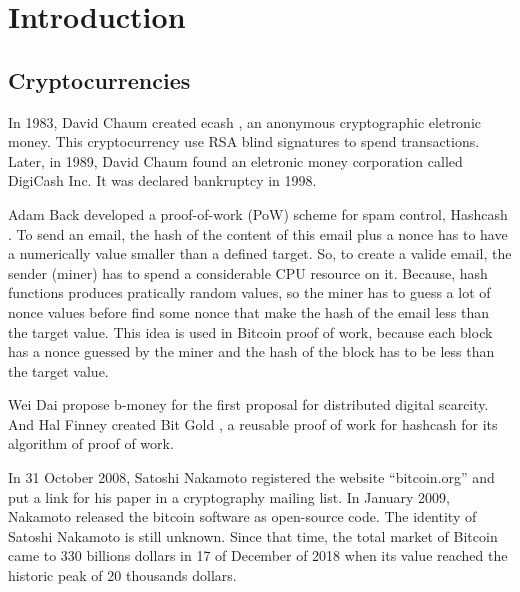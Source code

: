 \documentclass[12pt]{article}
\begin{document}

\tableofcontents
\pagebreak

\renewcommand{\thesection}{\arabic{section}}
\section{Introduction}

\subsection{Cryptocurrencies}

In 1983, David Chaum created ecash \cite{panurach1996money} , an anonymous cryptographic eletronic money.
This cryptocurrency use RSA blind signatures \cite{chaum1983blind} to spend transactions.
Later, in 1989, David Chaum found an eletronic money corporation called DigiCash Inc.
It was declared bankruptcy in 1998.

Adam Back developed a proof-of-work (PoW) scheme for spam control, Hashcash \cite{back2002hashcash}.
To send an email, the hash of the content of this email plus a nonce has to have a numerically value smaller than a defined target.
So, to create a valide email, the sender (miner) has to spend a considerable CPU resource on it.
Because, hash functions produces pratically random values, so the miner has to guess a lot of nonce values before find some nonce that make the hash of the email less than the target value.
This idea is used in Bitcoin proof of work, because each block has a nonce guessed by the miner and the hash of the block has to be less than the target value.

Wei Dai propose b-money \cite{dai1998b} for the first proposal for distributed digital scarcity.
And Hal Finney created Bit Gold \cite{wallace2011rise}, a reusable proof of work for hashcash for its algorithm of proof of work.

In 31 October 2008, Satoshi Nakamoto registered the website ``bitcoin.org'' and put a link for his paper \cite{nakamoto2008bitcoin} in a cryptography mailing list.
In January 2009, Nakamoto released the bitcoin software as open-source code.
The identity of Satoshi Nakamoto is still unknown.
Since that time, the total market of Bitcoin came to 330 billions dollars in 17 of December of 2018
when its value reached the historic peak of 20 thousands dollars.
\end{document}
